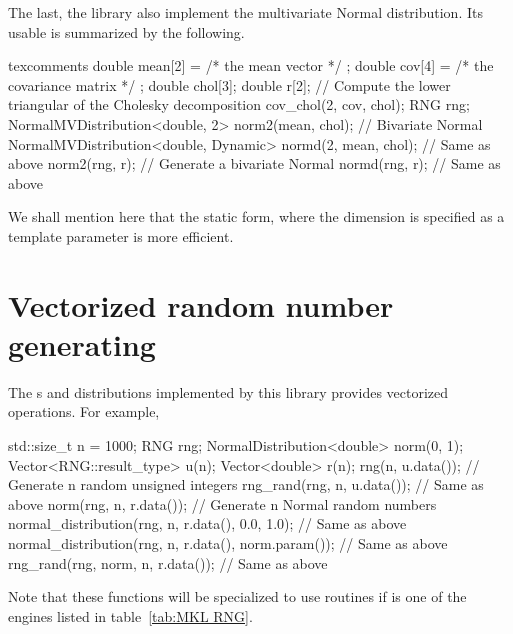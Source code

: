 The last, the library also implement the multivariate Normal distribution. Its
usable is summarized by the following.
\begin{cppcode*}{texcomments}
  double mean[2] = { /* the mean vector */ };
  double cov[4] = { /* the covariance matrix */ };
  double chol[3];
  double r[2];
  // Compute the lower triangular of the Cholesky decomposition
  cov_chol(2, cov, chol);
  RNG rng;
  NormalMVDistribution<double, 2> norm2(mean, chol); // Bivariate Normal
  NormalMVDistribution<double, Dynamic> normd(2, mean, chol); // Same as above
  norm2(rng, r); // Generate a bivariate Normal
  normd(rng, r); // Same as above
\end{cppcode*}
We shall mention here that the static form, where the dimension is specified as
a template parameter is more efficient.

\section{Vectorized random number generating}
\label{sec:Vectorized random number generating}

The \rng{}s and distributions implemented by this library provides vectorized
operations. For example,
\begin{cppcode}
  std::size_t n = 1000;
  RNG rng;
  NormalDistribution<double> norm(0, 1);
  Vector<RNG::result_type> u(n);
  Vector<double> r(n);
  rng(n, u.data());           // Generate n random unsigned integers
  rng_rand(rng, n, u.data()); // Same as above
  norm(rng, n, r.data());     // Generate n Normal random numbers
  normal_distribution(rng, n, r.data(), 0.0, 1.0);     // Same as above
  normal_distribution(rng, n, r.data(), norm.param()); // Same as above
  rng_rand(rng, norm, n, r.data());                    // Same as above
\end{cppcode}
Note that these functions will be specialized to use \mkl routines if
 is one of the engines listed in table~\ref{tab:MKL RNG}.
